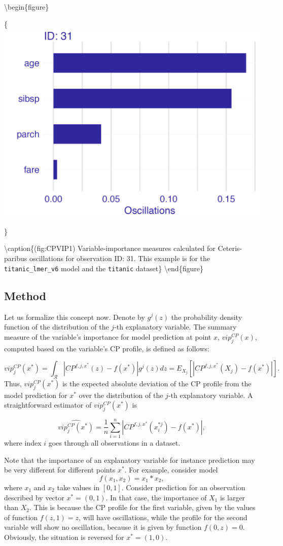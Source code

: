 \documentclass[12pt,]{krantz}
\theoremstyle{definition}
\theoremstyle{definition}
\theoremstyle{definition}
\theoremstyle{remark}
\begin{document}
\textbackslash{}begin\{figure\}

\{\centering \includegraphics[width=0.5\linewidth]{figure/oscillations_all_lmr_plot}

\}

\textbackslash{}caption\{(fig:CPVIP1) Variable-importance measures
calculated for Ceteris-paribus oscillations for observation ID: 31. This
example is for the \texttt{titanic\_lmer\_v6} model and the
\texttt{titanic} dataset\}\label{fig:CPVIP1} \textbackslash{}end\{figure\}

\hypertarget{method-1}{%
\subsection{Method}\label{method-1}}

Let us formalize this concept now. Denote by \(g^j(z)\) the probability
density function of the distribution of the \(j\)-th explanatory
variable. The summary measure of the variable's importance for model
prediction at point \(x\), \(vip^{CP}_j(x)\), computed based on the
variable's CP profile, is defined as follows:

\[
vip^{CP}_j(x^*) = \int_{\mathcal R} |CP^{f,j,x^*}(z) - f(x^*)| g^j(z)dz=E_{X_j}[|CP^{f,j,x^*}(X_j) - f(x^*)|].
\] Thus, \(vip^{CP}_j(x^*)\) is the expected absolute deviation of the
CP profile from the model prediction for \(x^*\) over the distribution
of the \(j\)-th explanatory variable. A straightforward estimator of
\(vip^{CP}_j(x^*)\) is

\[
\widehat{ vip^{CP}_j(x^*)} = \frac 1n \sum_{i=1}^n |CP^{f,j,x^*}(x^{*j}_i) - f(x^*)|,
\] where index \(i\) goes through all observations in a dataset.

Note that the importance of an explanatory variable for instance
prediction may be very different for different points \(x^*\). For
example, consider model \[
f(x_1, x_2) = x_1 * x_2,
\] where \(x_1\) and \(x_2\) take values in \([0,1]\). Consider
prediction for an observation described by vector \(x^* = (0,1)\). In
that case, the importance of \(X_1\) is larger than \(X_2\). This is
because the CP profile for the first variable, given by the values of
function \(f(z,1)=z\), will have oscillations, while the profile for the
second variable will show no oscillation, because it is given by
function \(f(0,z)=0\). Obviously, the situation is reversed for
\(x^*=(1,0)\).
\end{document}
